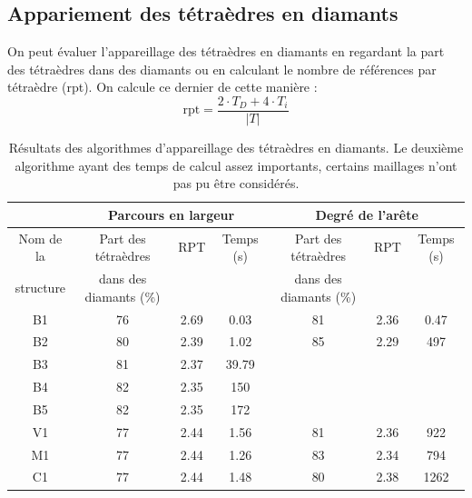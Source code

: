 \subsection{Appariement des tétraèdres en diamants}
\noindent
On peut évaluer l'appareillage des tétraèdres en diamants en regardant la part des tétraèdres dans des diamants ou en calculant le nombre de références par tétraèdre (rpt). On calcule ce dernier de cette manière :\\
\begin{equation}
\text{rpt} = \frac{2\cdot T_D+4\cdot T_i}{|T|}
\end{equation}
\begin{table}[H]
\centering
\footnotesize
\begin{tabular}{|c | c | c | c| c | c | c |}
\hline
& \multicolumn{3}{|c|}{Parcours en largeur}& \multicolumn{3}{|c|}{Degré de l'arête}\\
\hline
Nom de la & Part des tétraèdres & RPT & Temps (s) & Part des tétraèdres & RPT & Temps (s)\\
structure&dans des diamants (\%)&&&dans des diamants (\%)&&\\
\hline
B1 & 76 & 2.69 & 0.03 & 81 & 2.36 & 0.47 \\
B2 &  80 & 2.39 & 1.02 & 85 & 2.29 & 497 \\
B3 & 81& 2.37 & 39.79 &  &  &\\
B4 & 82& 2.35 & 150 &  &  &\\
B5 & 82 & 2.35 & 172 &  &  &\\
V1 & 77& 2.44 & 1.56 & 81& 2.36 & 922\\
M1 & 77& 2.44 & 1.26 & 83 & 2.34 & 794\\
C1 & 77& 2.44 & 1.48 & 80 & 2.38 & 1262\\
\hline  
\end{tabular}
\caption{Résultats des algorithmes d'appareillage des tétraèdres en diamants. Le deuxième algorithme ayant des temps de calcul assez importants, certains maillages n'ont pas pu être considérés.}
\label{tab:results_performances}
\end{table}

